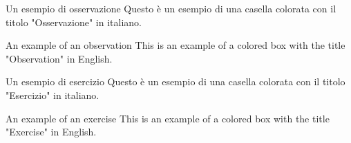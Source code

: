\begin{osservazione}{Un esempio di osservazione}
  Questo è un esempio di una casella colorata con il titolo "Osservazione" in italiano.
\end{osservazione}

\begin{observation}{An example of an observation}
  This is an example of a colored box with the title "Observation" in English.
\end{observation}

\begin{esercizio}{Un esempio di esercizio}
  Questo è un esempio di una casella colorata con il titolo "Esercizio" in italiano.
\end{esercizio}

\begin{exercise}{An example of an exercise}
  This is an example of a colored box with the title "Exercise" in English.
\end{exercise}
